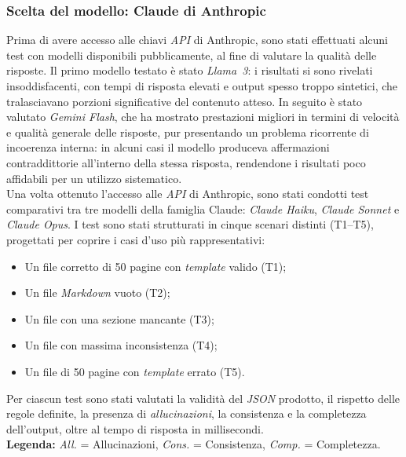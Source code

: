 \subsubsection[Scelta del modello]{Scelta del modello: Claude di Anthropic}

Prima di avere accesso alle chiavi \emph{API} di Anthropic, sono stati effettuati alcuni test con modelli disponibili pubblicamente, al fine di valutare la qualità delle risposte. Il primo modello testato è stato \emph{Llama~3}: i risultati si sono rivelati insoddisfacenti, con tempi di risposta elevati e output spesso troppo sintetici, che tralasciavano porzioni significative del contenuto atteso. In seguito è stato valutato \emph{Gemini Flash}, che ha mostrato prestazioni migliori in termini di velocità e qualità generale delle risposte, pur presentando un problema ricorrente di incoerenza interna: in alcuni casi il modello produceva affermazioni contraddittorie all'interno della stessa risposta, rendendone i risultati poco affidabili per un utilizzo sistematico.\\

Una volta ottenuto l'accesso alle \emph{API} di Anthropic, sono stati condotti test comparativi tra tre modelli della famiglia Claude: \emph{Claude Haiku}, \emph{Claude Sonnet} e \emph{Claude Opus}. I test sono stati strutturati in cinque scenari distinti (T1--T5), progettati per coprire i casi d'uso più rappresentativi:
\begin{itemize}
    \item Un file corretto di 50 pagine con \emph{template} valido (T1);
    \item Un file \emph{Markdown} vuoto (T2);
    \item Un file con una sezione mancante (T3);
    \item Un file con massima inconsistenza (T4);
    \item Un file di 50 pagine con \emph{template} errato (T5).
\end{itemize}
Per ciascun test sono stati valutati la validità del \emph{JSON} prodotto, il rispetto delle regole definite, la presenza di \emph{allucinazioni}, la consistenza e la completezza dell'output, oltre al tempo di risposta in millisecondi.\\

\textbf{Legenda:} \textit{All.} = Allucinazioni, \textit{Cons.} = Consistenza, \textit{Comp.} = Completezza.

\begingroup
\setlength{\LTleft}{-20cm plus 1fill}
\setlength{\LTright}{-20cm plus 1fill}

